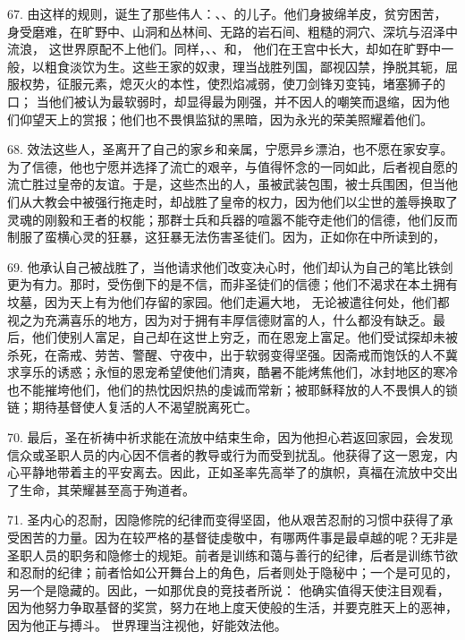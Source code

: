 67. 由这样的规则，诞生了那些伟人：、、的儿子。他们身披绵羊皮，贫穷困苦，身受磨难，在旷野中、山洞和丛林间、无路的岩石间、粗糙的洞穴、深坑与沼泽中流浪， 这世界原配不上他们。同样，、、和， 他们在王宫中长大，却如在旷野中一般，以粗食淡饮为生。这些王家的奴隶，理当战胜列国，鄙视囚禁，挣脱其轭，屈服权势，征服元素，熄灭火的本性，使烈焰减弱，使刀剑锋刃变钝，堵塞狮子的口； 当他们被认为最软弱时，却显得最为刚强，并不因人的嘲笑而退缩，因为他们仰望天上的赏报；他们也不畏惧监狱的黑暗，因为永光的荣美照耀着他们。\par

68. 效法这些人，圣离开了自己的家乡和亲属，宁愿异乡漂泊，也不愿在家安享。为了信德，他也宁愿并选择了流亡的艰辛，与值得怀念的一同如此，后者视自愿的流亡胜过皇帝的友谊。于是，这些杰出的人，虽被武装包围，被士兵围困，但当他们从大教会中被强行拖走时，却战胜了皇帝的权力，因为他们以尘世的羞辱换取了灵魂的刚毅和王者的权能；那群士兵和兵器的喧嚣不能夺走他们的信德，他们反而制服了蛮横心灵的狂暴，这狂暴无法伤害圣徒们。因为，正如你在中所读到的， \par

69. 他承认自己被战胜了，当他请求他们改变决心时，他们却认为自己的笔比铁剑更为有力。那时，受伤倒下的是不信，而非圣徒们的信德；他们不渴求在本土拥有坟墓，因为天上有为他们存留的家园。他们走遍大地，  无论被遣往何处，他们都视之为充满喜乐的地方，因为对于拥有丰厚信德财富的人，什么都没有缺乏。最后，他们使别人富足，自己却在这世上穷乏，而在恩宠上富足。他们受试探却未被杀死，在斋戒、劳苦、警醒、守夜中，出于软弱变得坚强。因斋戒而饱饫的人不冀求享乐的诱惑；永恒的恩宠希望使他们清爽，酷暑不能烤焦他们，冰封地区的寒冷也不能摧垮他们，他们的热忱因炽热的虔诚而常新；被耶稣释放的人不畏惧人的锁链；期待基督使人复活的人不渴望脱离死亡。\par

70. 最后，圣在祈祷中祈求能在流放中结束生命，因为他担心若返回家园，会发现信众或圣职人员的内心因不信者的教导或行为而受到扰乱。他获得了这一恩宠，内心平静地带着主的平安离去。因此，正如圣率先高举了的旗帜，真福在流放中交出了生命，其荣耀甚至高于殉道者。\par

71. 圣内心的忍耐，因隐修院的纪律而变得坚固，他从艰苦忍耐的习惯中获得了承受困苦的力量。因为在较严格的基督徒虔敬中，有哪两件事是最卓越的呢？无非是圣职人员的职务和隐修士的规矩。前者是训练和蔼与善行的纪律，后者是训练节欲和忍耐的纪律；前者恰如公开舞台上的角色，后者则处于隐秘中；一个是可见的，另一个是隐藏的。因此，一如那优良的竞技者所说： 他确实值得天使注目观看，因为他努力争取基督的奖赏，努力在地上度天使般的生活，并要克胜天上的恶神，因为他正与搏斗。 世界理当注视他，好能效法他。\par

